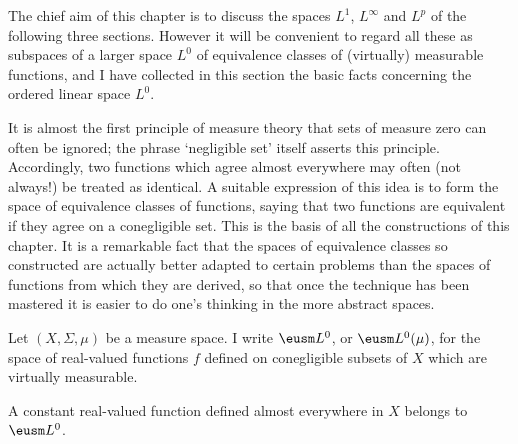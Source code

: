 
\loadeusm

\def\chaptername{Function spaces}
\def\sectionname{$\eusm L^0$ and $L^0$}


The chief aim of this chapter is to discuss the spaces $L^1$,
$L^{\infty}$ and $L^p$ of the following three sections.   However it
will be convenient to regard all these as subspaces of a larger space
$L^0$ of equivalence classes of (virtually) measurable functions, and
I have collected in this section the basic facts concerning the ordered
linear space $L^0$.

It is almost the first principle of measure theory that sets of measure
zero can often be ignored;  the phrase `negligible set' itself
asserts this principle.   Accordingly, two functions which agree almost
everywhere may often (not always!) be treated as identical.   A suitable
expression of this idea is to form the space of equivalence classes of
functions, saying that two functions are equivalent if they agree on a
conegligible set.   This is the basis of all the constructions of this
chapter.   It is a remarkable fact that the spaces of equivalence
classes so constructed are actually better adapted to certain problems
than the spaces of functions from which they are derived, so that once
the technique has been mastered it is easier to do one's
thinking in the more abstract spaces.


Let $(X,\Sigma,\mu)$ be a measure space.
I write $\eusm L^0$, or $\eusm L^0(\mu)$, for the space of
real-valued functions $f$
defined on conegligible subsets of $X$ which are virtually
measurable.

 A constant real-valued function defined almost everywhere in $X$ belongs to $\eusm L^0$.

